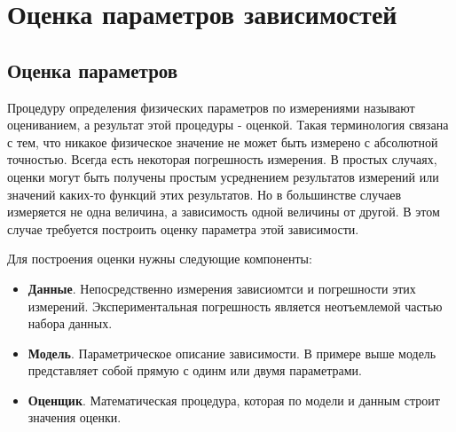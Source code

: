 \chapter{Оценка параметров зависимостей}
\label{ch:estimate}


\section{Оценка параметров}

Процедуру определения физических параметров по измерениями называют оцениванием,
а результат этой процедуры - оценкой. Такая терминология связана с тем, что
никакое физическое значение не может быть измерено с абсолютной точностью.
Всегда есть некоторая погрешность измерения. В простых случаях, оценки могут
быть получены простым усреднением результатов измерений или значений каких-то
функций этих результатов. Но в большинстве случаев измеряется не одна величина,
а зависимость одной величины от другой. В этом случае требуется построить оценку
параметра этой зависимости.


Для построения оценки нужны следующие компоненты:
\begin{itemize}
    \item \textbf{Данные}. Непосредственно измерения зависиомтси и погрешности
этих измерений. Экспериментальная погрешность является неотъемлемой частью
набора данных.
    \item \textbf{Модель}. Параметрическое описание зависимости. В примере выше
модель представляет собой прямую с одинм или двумя параметрами.
    \item \textbf{Оценщик}. Математическая процедура, которая по модели и данным
строит значения оценки.
\end{itemize}


